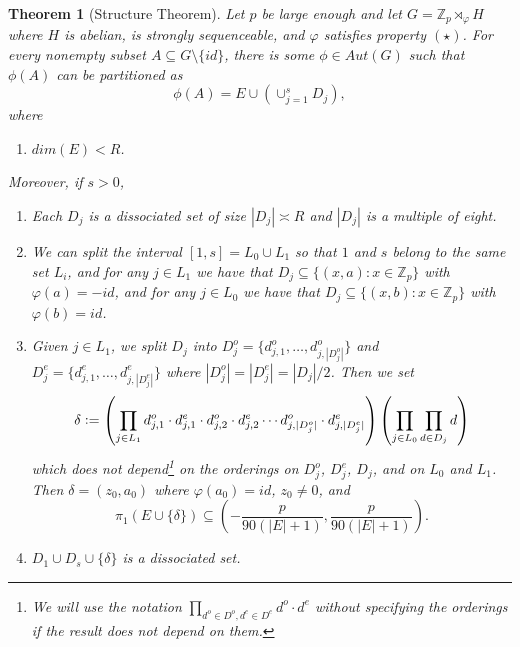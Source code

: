 \documentclass[11pt]{amsart}
\newtheorem{theorem}{Theorem}[section]
\theoremstyle{definition}
\begin{document}
\begin{theorem}[Structure Theorem]\label{prop:refined-structure}
Let $p$ be large enough and let $G=\mathbb{Z}_{p} \rtimes_{\varphi} H$ where $H$ is abelian, is strongly sequenceable, and $\varphi$ satisfies property $(\star)$. For every nonempty subset $A \subseteq G \setminus \{id\}$, there is some $\phi \in Aut(G)$ such that $\phi(A)$ can be partitioned as
$$\phi(A) = E \cup\left(\cup_{j=1}^{s} D_j\right),$$
where
\begin{enumerate}
\item[(i)] $dim(E)<R$. %
\end{enumerate}
Moreover, if $s>0$,
\begin{enumerate}
\item[(ii)] Each $D_j$ is a dissociated set of size $|D_j| \asymp R$ and $|D_j|$ is a multiple of eight.
\item[(iii)] We can split the interval $[1,s]=L_0\cup L_1$ so that $1$ and $s$ belong to the same set $L_i$, and for any $j\in  L_1$ we have that $D_j\subseteq \{(x,a) : x\in \mathbb{Z}_p\}$ with $\varphi(a)=-id$, and for any $j\in L_0$ we have that $D_j\subseteq \{(x,b) : x\in \mathbb{Z}_p\}$ with $\varphi(b)=id$. 
\item[(iv)] Given $j\in L_1$, we split $D_j$ into $D_j^o = \{d_{j,1}^o, \ldots, d_{j,|D_j^o|}^o\}$ and $D_j^e = \{d_{j,1}^e, \ldots, d_{j,|D_j^e|}^e\}$ where $|D_j^o|=|D_j^e|=|D_j|/2$. Then we set
$$\delta\vcentcolon=\left(\prod_{j\in L_1} d_{j,1}^o \cdot d_{j,1}^e \cdot d_{j,2}^o \cdot d_{j,2}^e \cdots d_{j, |D_j^o|}^o \cdot d_{j, |D_j^e|}^e \right) \left(\prod_{j\in L_0}\prod_{d\in D_j} d\right)$$
which does not depend\footnote{We will use the notation $\prod_{d^o \in D^o, d^e \in D^e} d^o \cdot d^e$ without specifying the orderings if the result does not depend on them.} on the orderings on $D_j^o$, $D_j^e$, $D_j$, and on $L_0$ and $L_1$.
Then $\delta=(z_0,a_0)$ where $\varphi(a_0)=id$, $z_0\not=0$, and
$$\pi_1(E\cup\{\delta\}) \subseteq \left(-\frac{p}{90(|E|+1)},\frac{p}{90(|E|+1)}\right).$$
\item[(v)] $D_1 \cup D_s \cup \{\delta\}$ is a dissociated set.
\end{enumerate}
\end{theorem}
\end{document}
